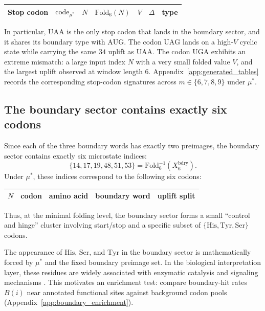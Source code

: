 \begin{center}
\small
\setlength{\tabcolsep}{6pt}
\renewcommand{\arraystretch}{1.15}
\begin{tabular}{lllllll}
\toprule
Stop codon & $\mathrm{code}_{\mu^\ast}$ & $N$ & $\mathrm{Fold}_6(N)$ & $V$ & $\Delta$ & type \\
\midrule

\end{tabular}
\end{center}

In particular, $\mathrm{UAA}$ is the only stop codon that lands in the boundary sector, and it shares its boundary type with $\mathrm{AUG}$.
The codon $\mathrm{UAG}$ lands on a high-$V$ cyclic state while carrying the same $34$ uplift as $\mathrm{UAA}$.
The codon $\mathrm{UGA}$ exhibits an extreme mismatch: a large input index $N$ with a very small folded value $V$, and the largest uplift observed at window length $6$.
Appendix~\ref{app:generated_tables} records the corresponding stop-codon signatures across $m\in\{6,7,8,9\}$ under $\mu^\ast$.

\subsection{The boundary sector contains exactly six codons}
\label{sec:boundary_sector_codons}

Since each of the three boundary words has exactly two preimages, the boundary sector contains exactly six microstate indices:
\[
\{14,17,19,48,51,53\}=\mathrm{Fold}_6^{-1}(X_6^{\mathrm{bdry}}).
\]
Under $\mu^\ast$, these indices correspond to the following six codons:
\begin{center}
\small
\setlength{\tabcolsep}{6pt}
\renewcommand{\arraystretch}{1.15}
\begin{tabular}{rllll}
\toprule
$N$ & codon & amino acid & boundary word & uplift split \\
\midrule

\end{tabular}
\end{center}

Thus, at the minimal folding level, the boundary sector forms a small ``control and hinge'' cluster involving start/stop and a specific subset of $\{\mathrm{His},\mathrm{Tyr},\mathrm{Ser}\}$ codons.

\begin{remark}
The appearance of $\mathrm{His}$, $\mathrm{Ser}$, and $\mathrm{Tyr}$ in the boundary sector is mathematically forced by $\mu^\ast$ and the fixed boundary preimage set.
In the biological interpretation layer, these residues are widely associated with enzymatic catalysis and signaling mechanisms \cite{NelsonCox2017,Alberts2014}.
This motivates an enrichment test: compare boundary-hit rates $B(i)$ near annotated functional sites against background codon pools (Appendix~\ref{app:boundary_enrichment}).
\end{remark}

